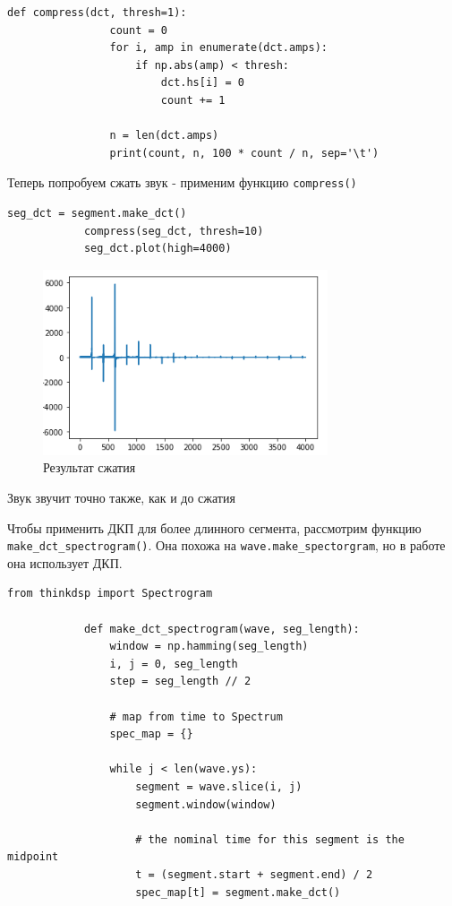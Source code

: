 \documentclass[a4paper,12pt]{article}
\begin{document}
\begin{enumerate}
		\begin{lstlisting}[caption=Функция \texttt{compress()}]
			def compress(dct, thresh=1):
				count = 0
				for i, amp in enumerate(dct.amps):
					if np.abs(amp) < thresh:
						dct.hs[i] = 0
						count += 1
				
				n = len(dct.amps)
				print(count, n, 100 * count / n, sep='\t')
		\end{lstlisting}	
		
		Теперь попробуем сжать звук - применим функцию \texttt{compress()}
		\begin{lstlisting}[caption=Сжимаем звук]
			seg_dct = segment.make_dct()
			compress(seg_dct, thresh=10)
			seg_dct.plot(high=4000)
		\end{lstlisting}
		\begin{figure}[H]
			\centering
			\includegraphics[width=0.75\textwidth]{2_2.png}
			\caption{Результат сжатия}
			\label{fig:2.2}
		\end{figure}
		
		Звук звучит точно также, как и до сжатия
		
		Чтобы применить ДКП для более длинного сегмента, рассмотрим функцию \texttt{make\_dct\_spectrogram()}. Она похожа на \texttt{wave.make\_spectorgram}, но в работе она использует ДКП.
		\begin{lstlisting}[caption=Функция \texttt{make\_dct\_spectrogram()}]
			from thinkdsp import Spectrogram
			
			def make_dct_spectrogram(wave, seg_length):
				window = np.hamming(seg_length)
				i, j = 0, seg_length
				step = seg_length // 2
				
				# map from time to Spectrum
				spec_map = {}
				
				while j < len(wave.ys):
					segment = wave.slice(i, j)
					segment.window(window)
					
					# the nominal time for this segment is the midpoint
					t = (segment.start + segment.end) / 2
					spec_map[t] = segment.make_dct()
					

\end{lstlisting}
\end{enumerate}
\end{document}
